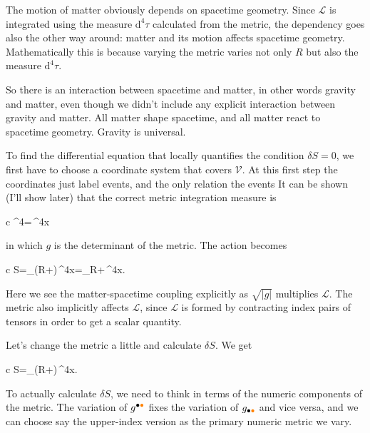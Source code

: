 \documentclass[11pt,oneside%
]{memoir}
\newenvironment{eqna}{\begin{IEEEeqnarray*}{c}}{\end{IEEEeqnarray*}\ignorespacesafterend}
\newcommand{\dd}{\mathrm{d}}
\newcommand{\coa}{{\color{black}\bullet}}
\newcommand{\cob}{{\color{oranssi}\bullet}}
\begin{document}
The motion of matter obviously depends on spacetime geometry. Since \(\mathcal{L}\) is integrated using the measure \(\dd^4\tau\) calculated from the metric, the dependency goes also the other way around: matter and its motion affects spacetime geometry. Mathematically this is because varying the metric varies not only \(R\) but also the measure \(\dd^4\tau\). 

So there is an interaction between spacetime and matter, in other words gravity and matter, even though we didn't include any explicit interaction between gravity and matter. All matter shape spacetime, and all matter react to spacetime geometry. Gravity is universal.

To find the differential equation that locally quantifies the condition \(\delta S=0\), we first have to choose a coordinate system that covers \(\mathcal{V}\). At this first step the coordinates just label events, and the only relation the events It can be shown (I'll show later) that the correct metric integration measure is
\begin{eqna}
\dd^4\tau=\,\dd^4x
\end{eqna}
in which \(g\) is the determinant of the metric. The action becomes
\begin{eqna}
S=\int_{}(R+)\,\dd^4x=\int_{}R+\,\dd^4x.
\end{eqna}
Here we see the matter-spacetime coupling explicitly as \(\sqrt{|g|}\) multiplies \(\mathcal{L}\). The metric also implicitly affects \(\mathcal{L}\), since \(\mathcal{L}\) is formed by contracting index pairs of tensors in order to get a scalar quantity.

Let's change the metric a little and calculate \(\delta S\). We get
\begin{eqna}
\delta S=\int_{}\delta\left(R+\right)\,\dd^4x.%
\end{eqna}
To actually calculate \(\delta S\), we need to think in terms of the numeric components of the metric. The variation of \(g^{\coa\cob}\) fixes the variation of \(g_{\coa\cob}\) and vice versa, and we can choose say the upper-index version as the primary numeric metric we vary.
\end{document}
